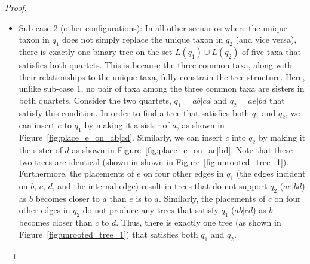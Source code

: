 \documentclass[runningheads]{llncs}
\begin{document}
\begin{proof}
\begin{itemize}
\begin{itemize}
        


    \item Sub-case 2 (other configurations): In all other scenarios where the unique taxon in $q_1$ does not simply replace the unique taxon in $q_2$ (and vice versa), there is exactly one binary tree on the set $L(q_1)\cup L(q_2)$ of five taxa that satisfies both quartets. This is because the three common taxa, along with their relationships to the unique taxa, fully constrain the tree structure. Here, unlike sub-case 1, no pair of taxa among the three common taxa are sisters in both quartets. Consider the two quartets, $q_1 = ab|cd$ and $q_2 =  ae|bd$ %
    that satisfy this condition. %
    In order to find a tree that satisfies both $q_1$ and $q_2$, we can insert $e$ to $q_1$ by making it a sister of $a$, as shown in Figure~\ref{fig:place_e_on_ab|cd}. Similarly, we can insert $c$ into $q_2$ by making it the sister of $d$ as shown in Figure~\ref{fig:place_c_on_ae|bd}. Note that these two trees are identical (shown in shown in Figure~\ref{fig:unrooted_tree_1}). Furthermore, the placements of $e$ on four other edges in $q_1$ (the edges incident on $b$, $c$, $d$, and the internal edge) result in trees that do not support $q_2$ ($ae|bd$) as $b$ becomes closer to $a$ than $e$ is to $a$. Similarly, the placements of $c$ on four other edges in $q_2$ do not produce any trees that satisfy $q_1$ ($ab|cd$) as  $b$ becomes closer than $c$ to $d$. Thus, there is exactly one tree (as shown in Figure~\ref{fig:unrooted_tree_1}) that satisfies both $q_1$ and $q_2$.


    \end{itemize}



\end{itemize}

\end{proof}
\end{document}
